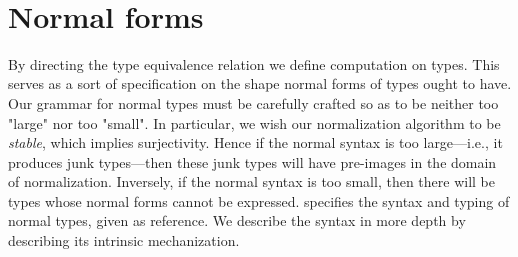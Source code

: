 \documentclass[authoryear, acmsmall, screen, review, nonacm]{acmart}
\begin{document}
\begin{code}
\AgdaSymbol{\{}\AgdaSymbol{\}}\AgdaSpace{}%
\AgdaSymbol{\{}\AgdaSpace{}%
\AgdaSymbol{:}\AgdaSpace{}%
\AgdaSpace{}%
\AgdaSymbol{(}\AgdaSpace{}%
\AgdaOperator{\AgdaInductiveConstructor{,,}}\AgdaSpace{}%
\AgdaSymbol{)}\AgdaSpace{}%
\AgdaSymbol{\}}\AgdaSpace{}%
\AgdaSymbol{\{}\AgdaSpace{}%
\AgdaSymbol{:}\AgdaSpace{}%
\AgdaSpace{}%
\AgdaSymbol{(}\AgdaSpace{}%
\AgdaSymbol{)\}}\AgdaSpace{}%
\<%
\\
\>[.][@{}l@{}]\<[2656I]%
\>[8]\AgdaSpace{}%
\AgdaSymbol{\{}\AgdaSpace{}%
\AgdaSymbol{=}\AgdaSpace{}%
\AgdaSymbol{\}}\AgdaSpace{}%
\AgdaSpace{}%
\AgdaSymbol{(}\AgdaSpace{}%
\AgdaSpace{}%
\AgdaSpace{}%
\AgdaSymbol{)}\AgdaSpace{}%
\AgdaSpace{}%
\AgdaSpace{}%
\AgdaSymbol{(}\AgdaSpace{}%
\AgdaSymbol{\{}\AgdaSpace{}%
\AgdaSymbol{=}\AgdaSpace{}%
\AgdaSymbol{\}}\AgdaSpace{}%
\AgdaSpace{}%
\AgdaSymbol{(}\AgdaSpace{}%
\AgdaSpace{}%
\AgdaSpace{}%
\AgdaSymbol{))}\<%
\end{code}
\begin{code}[hide]%
\>[0]\AgdaSpace{}%
\AgdaSymbol{=}\AgdaSpace{}%
\AgdaSpace{}%
\AgdaSymbol{\AgdaUnderscore{}}\<%
\end{code}


\section{Normal forms}

By directing the type equivalence relation we define computation on types. This serves as a sort of specification on the shape normal forms of types ought to have. Our grammar for normal types must be carefully crafted so as to be neither too "large" nor too "small". In particular, we wish our normalization algorithm to be \emph{stable}, which implies surjectivity. Hence if the normal syntax is too large---i.e., it produces junk types---then these junk types will have pre-images in the domain of normalization. Inversely, if the normal syntax is too small, then there will be types whose normal forms cannot be expressed.  specifies the syntax and typing of normal types, given as reference. We describe the syntax in more depth by describing its intrinsic mechanization.
\end{document}
